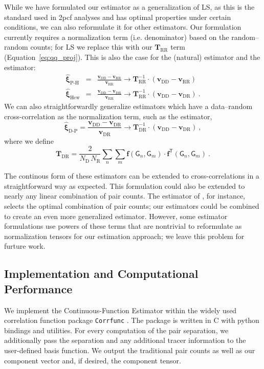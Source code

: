 \documentclass[modern]{aastex62}
\newcommand{\cf}{2pcf\xspace} %
\newcommand{\est}{the Continuous-Function Estimator\xspace}
\newcommand{\LS}{LS\xspace}
\newcommand{\inv}{^{-1}}
\newcommand{\T}{^{\mathsf{T}}}
\newcommand{\bld}[1]{\bm{#1}} %
\newcommand{\vv}[1]{\bld{v}_\mathrm{#1}}
\newcommand{\TT}[1]{\bld{T}_\mathrm{#1}}
\newcommand{\ff}{\bld{f}}
\newcommand{\NN}[1]{N_\mathrm{#1}}
\newcommand{\GG}[1]{\mathsf{G}_{#1}}
\begin{document}
While we have formulated our estimator as a generalization of \LS, as this is the standard used in \cf analyses and has optimal properties under certain conditions, we can also reformulate it for other estimators.
Our formulation currently requires a normalization term (i.e. denominator) based on the random--random counts; for \LS we replace this with our $\TT{RR}$ term (Equation~\ref{eq:qq_proj}).
This is also the case for the \cite{PeeblesHauser1974} (natural) estimator and the \cite{Hewett1982} estimator:
\begin{eqnarray}
    \bld{\hat{\xi}}_\text{P-H} &=& \frac{\vv{DD} - \vv{RR}}{\vv{RR}} \rightarrow \TT{RR}\inv \cdot \left( \vv{DD} - \vv{RR} \right)\\
    \bld{\hat{\xi}}_\text{Hew} &=& \frac{\vv{DD} - \vv{DR}}{\vv{RR}} \rightarrow \TT{RR}\inv \cdot \left( \vv{DD} - \vv{DR} \right) ~.
\end{eqnarray}
We can also straightforwardly generalize estimators which have a data--random cross-correlation as the normalization term, such as the \cite{DavisPeebles1983} estimator,
\begin{equation}
    \bld{\hat{\xi}}_\text{D-P} = \frac{\vv{DD} - \vv{DR}}{\vv{DR}} \rightarrow \TT{DR}\inv \cdot \left( \vv{DD} - \vv{DR} \right) ~,
\end{equation}
where we define
\begin{equation}
    \TT{DR} = \frac{2}{\NN{D}\,\NN{R}} \sum_{n} \sum_{m} \ff(\GG{n}, \GG{m}) \cdot \ff\T(\GG{n}, \GG{m}) ~.
\end{equation}

The continous form of these estimators can be extended to cross-correlations in a straightforward way as expected.
This formulation could also be extended to nearly any linear combination of pair counts.
The estimator of \cite{VargasMagana2013}, for instance, selects the optimal combination of pair counts; our estimators could be combined to create an even more generalized estimator.
However, some estimator formulations use powers of these terms that are nontrivial to reformulate as normalization tensors for our estimation approach; we leave this problem for furture work.


\subsection{Implementation and Computational Performance}
\label{sec:comp}

We implement \est within the widely used correlation function package \texttt{Corrfunc} \citep{Sinha2019}.
The package is written in C with python bindings and utilities.
For every computation of the pair separation, we additionally pass the separation and any additional tracer information to the user-defined basis function.
We output the traditional pair counts as well as our component vector and, if desired, the component tensor.
\end{document}
